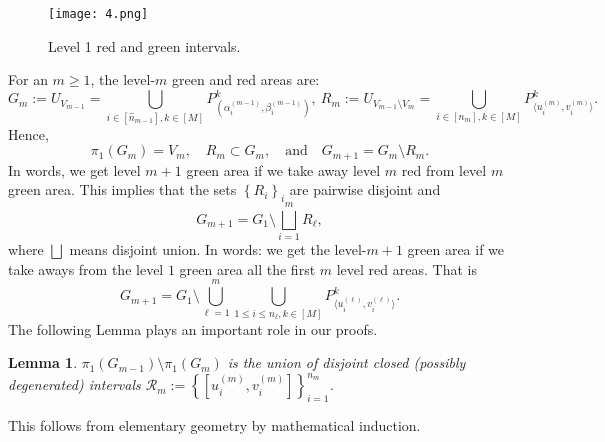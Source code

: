 \documentclass[amssymb,amsfonts,12pt,verbatim,righttag,oneside]{amsart}
\numberwithin{equation}{section} %
\theoremstyle{plain}
\theoremstyle{plain}
\newtheorem{lemma}[theorem]{Lemma}
\begin{document}
\begin{figure}[ht!]
  \centering
  \texttt{[image: 4.png]}
  \caption{Level 1 red and green intervals.}\label{y91}
\end{figure}


For an $m\geq 1$,
 the level-$m$ green and red areas are:
\begin{equation}
\label{z57}
G_m:=U_{V_{m-1}}=
\bigcup\limits_{i\in [\widehat{n}_{m-1}],k\in [M]}
P _{ \left(  \alpha _{i}^{(m-1) },\beta  _{i}^{(m-1) } \right)}^{k },\
R_m:=U_{V_{m-1}\setminus  V_m}=
\bigcup\limits_{i\in [n_m],k\in [M]}
P _{ \langle  u_i^{(m)}, v_i^{(m)}  \rangle}^{ k}.
\end{equation}
Hence,
$$
\pi _1(G_m)=V_m,\quad
R_m\subset  G_m, \quad \text{and} \quad
G_{m+1}=G_m\setminus R_m.
$$
In words, we get level $m+1$ green area if we take away level $m$ red from level $m$ green area. This implies that the sets $\left\{ R_i \right\}_i$
are pairwise disjoint and
\begin{equation}
\label{z62}
G_{m+1}=G_1\setminus \bigsqcup\limits _{i=1}^{m } R_{\ell },
\end{equation}
where $\bigsqcup$ means disjoint union.
In words: we get the level-$m+1$ green area if we take aways from the level $1$ green area all the first $m$ level red areas.
That is
 \begin{equation}
\label{z73}
G_{m+1}=G_1\setminus \bigcup\limits _{\ell =1}^{m }
\bigcup\limits_{1\leq i\leq n_{\ell }, k\in[M]}
{P }_{\langle u_i^{(\ell )}, v_{i }^{(\ell ) } \rangle}^k.
\end{equation}
The following Lemma plays an important role in our proofs.
\begin{lemma}\label{z74}
 $\pi _1(G_{m-1})\setminus \pi _1(G_{m})$ is the union of disjoint closed (possibly degenerated) intervals
$\mathcal{R}_m:= \left\{ [u _{i}^{(m) },v _{i}^{(m) }] \right\}_{i=1}^{n_m } $.
\end{lemma}
This follows from elementary geometry by mathematical induction.
\end{document}
